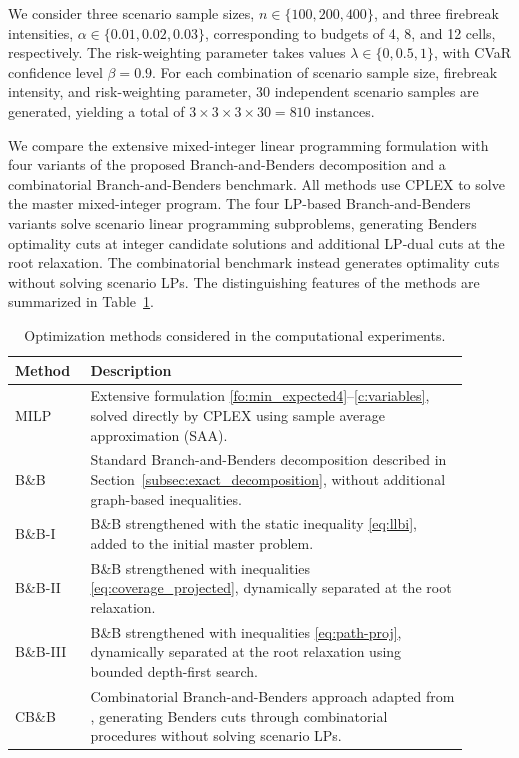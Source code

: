 \documentclass{itor}
\begin{document}
We consider three scenario sample sizes, $n\in\{100,200,400\}$, and
three firebreak intensities, $\alpha\in\{0.01,0.02,0.03\}$, corresponding
to budgets of 4, 8, and 12 cells, respectively. The risk-weighting
parameter takes values $\lambda\in\{0,0.5,1\}$, with CVaR confidence
level $\beta=0.9$. For each combination of scenario sample size, firebreak intensity, and risk-weighting parameter, 30 independent scenario samples are generated, yielding a total of $3\times3\times3\times30=810$ instances.

We compare the extensive mixed-integer linear programming formulation
with four variants of the proposed Branch-and-Benders decomposition and
a combinatorial Branch-and-Benders benchmark. All methods use CPLEX to solve the master mixed-integer
program. The four LP-based Branch-and-Benders variants
solve scenario linear programming subproblems, generating
Benders optimality cuts at integer candidate solutions
and additional LP-dual cuts at the root relaxation.
The combinatorial benchmark instead generates optimality
cuts without solving scenario LPs. The distinguishing
features of the methods are summarized in
Table~\ref{tab:methods}.

\begin{table}[htbp]
\centering
\normalfont
\caption{Optimization methods considered in the computational experiments.}
\label{tab:methods}
\begin{tabular}{p{0.14\linewidth}p{0.76\linewidth}}
\toprule
Method & Description \\
\midrule
MILP &
Extensive formulation
\eqref{fo:min_expected4}--\eqref{c:variables},
solved directly by CPLEX using sample average approximation (SAA).
\\

B\&B &
Standard Branch-and-Benders decomposition described in
Section~\ref{subsec:exact_decomposition}, without additional graph-based inequalities.
\\

B\&B-I &
B\&B strengthened with the static inequality \eqref{eq:llbi},
added to the initial master problem.
\\

B\&B-II &
B\&B strengthened with inequalities \eqref{eq:coverage_projected},
dynamically separated at the root relaxation.
\\

B\&B-III &
B\&B strengthened with inequalities \eqref{eq:path-proj},
dynamically separated at the root relaxation using bounded
depth-first search.
\\

CB\&B &
Combinatorial Branch-and-Benders approach adapted from
\citet{taninmics2024benders}, generating Benders cuts through
combinatorial procedures without solving scenario LPs.
\\
\bottomrule
\end{tabular}
\end{table}
\end{document}
